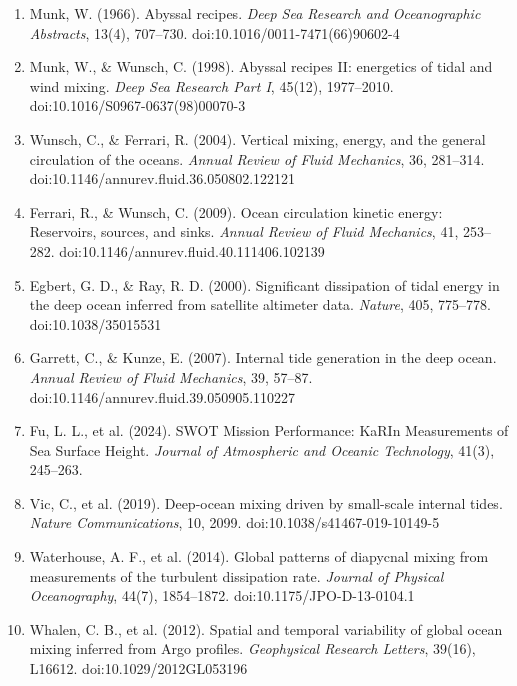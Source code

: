 \documentclass[11pt,a4paper]{article}
\begin{document}
\begin{enumerate}[leftmargin=*,itemsep=2pt,topsep=0pt]
\small

\item Munk, W. (1966). Abyssal recipes. \textit{Deep Sea Research and Oceanographic Abstracts}, 13(4), 707--730. doi:10.1016/0011-7471(66)90602-4

\item Munk, W., \& Wunsch, C. (1998). Abyssal recipes II: energetics of tidal and wind mixing. \textit{Deep Sea Research Part I}, 45(12), 1977--2010. doi:10.1016/S0967-0637(98)00070-3

\item Wunsch, C., \& Ferrari, R. (2004). Vertical mixing, energy, and the general circulation of the oceans. \textit{Annual Review of Fluid Mechanics}, 36, 281--314. doi:10.1146/annurev.fluid.36.050802.122121

\item Ferrari, R., \& Wunsch, C. (2009). Ocean circulation kinetic energy: Reservoirs, sources, and sinks. \textit{Annual Review of Fluid Mechanics}, 41, 253--282. doi:10.1146/annurev.fluid.40.111406.102139

\item Egbert, G. D., \& Ray, R. D. (2000). Significant dissipation of tidal energy in the deep ocean inferred from satellite altimeter data. \textit{Nature}, 405, 775--778. doi:10.1038/35015531

\item Garrett, C., \& Kunze, E. (2007). Internal tide generation in the deep ocean. \textit{Annual Review of Fluid Mechanics}, 39, 57--87. doi:10.1146/annurev.fluid.39.050905.110227

\item Fu, L. L., et al. (2024). SWOT Mission Performance: KaRIn Measurements of Sea Surface Height. \textit{Journal of Atmospheric and Oceanic Technology}, 41(3), 245--263.

\item Vic, C., et al. (2019). Deep-ocean mixing driven by small-scale internal tides. \textit{Nature Communications}, 10, 2099. doi:10.1038/s41467-019-10149-5

\item Waterhouse, A. F., et al. (2014). Global patterns of diapycnal mixing from measurements of the turbulent dissipation rate. \textit{Journal of Physical Oceanography}, 44(7), 1854--1872. doi:10.1175/JPO-D-13-0104.1

\item Whalen, C. B., et al. (2012). Spatial and temporal variability of global ocean mixing inferred from Argo profiles. \textit{Geophysical Research Letters}, 39(16), L16612. doi:10.1029/2012GL053196


\end{enumerate}
\end{document}
